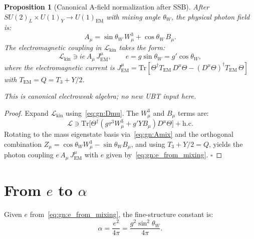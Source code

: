 \documentclass[12pt,a4paper]{article}
\newtheorem{proposition}[theorem]{Proposition}
\theoremstyle{definition}
\theoremstyle{remark}
\begin{document}
\begin{proposition}[Canonical A-field normalization after SSB]
\label{prop:gn:Anorm}
After $SU(2)_L \times U(1)_Y \to U(1)_{\mathrm{EM}}$ with mixing angle $\theta_W$,
the physical photon field is:
\begin{equation}
  A_\mu = \sin\theta_W\, W^3_\mu + \cos\theta_W\, B_\mu.
  \label{eq:gn:Amix}
\end{equation}
The electromagnetic coupling in $\mathcal{L}_{\mathrm{kin}}$ takes the form:
\begin{equation}
  \mathcal{L}_{\mathrm{kin}} \ni i e\, A_\mu\, J^\mu_{\mathrm{EM}},
  \qquad
  e = g \sin\theta_W = g' \cos\theta_W,
  \label{eq:gn:e_from_mixing}
\end{equation}
where the electromagnetic current is
$J^\mu_{\mathrm{EM}} = \mathrm{Tr}[\Theta^\dagger T_{\mathrm{EM}}\, D^\mu\Theta
                                   - (D^\mu\Theta)^\dagger T_{\mathrm{EM}}\, \Theta]$
with $T_{\mathrm{EM}} = Q = T_3 + Y/2$.

\textit{This is canonical electroweak algebra; no new UBT input here.}
\end{proposition}

\begin{proof}
Expand $\mathcal{L}_{\mathrm{kin}}$ using~\eqref{eq:gn:Dmu}.  The $W^3_\mu$ and $B_\mu$
terms are:
\begin{equation}
  \mathcal{L} \ni \mathrm{Tr}\bigl[\Theta^\dagger
    (g\tau^3 W^3_\mu + g' Y B_\mu)
    D^\mu\Theta\bigr] + \mathrm{h.c.}
\end{equation}
Rotating to the mass eigenstate basis via~\eqref{eq:gn:Amix} and the orthogonal
combination $Z_\mu = \cos\theta_W W^3_\mu - \sin\theta_W B_\mu$, and using
$T_3 + Y/2 = Q$, yields the photon coupling $e\,A_\mu\,J^\mu_{\mathrm{EM}}$
with $e$ given by~\eqref{eq:gn:e_from_mixing}.
$\square$
\end{proof}

\section{From $e$ to $\alpha$}
\label{sec:gn:alpha}

Given $e$ from~\eqref{eq:gn:e_from_mixing}, the fine-structure constant is:
\begin{equation}
  \alpha = \frac{e^2}{4\pi} = \frac{g^2 \sin^2\theta_W}{4\pi}.
  \label{eq:gn:alpha_from_e}
\end{equation}
\end{document}
